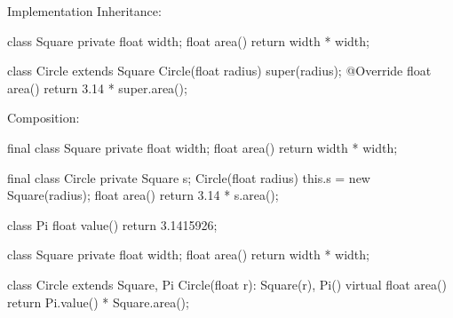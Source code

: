 \documentclass{article}
\begin{document}

\begin{pptWide}{2}
Implementation Inheritance:
\par
{\small\begin{ffcode}
class Square
  private float width;
  float area()
    return width * width;

class Circle extends Square
  Circle(float radius)
    super(radius);
  @Override float area()
    return 3.14 * super.area();
\end{ffcode}
}
\par\columnbreak\par
Composition:
\par
{\small\begin{ffcode}
final class Square
  private float width;
  float area()
    return width * width;

final class Circle
  private Square s;
  Circle(float radius)
    this.s = new Square(radius);
  float area()
    return 3.14 * s.area();
\end{ffcode}
}
\end{pptWide}
\plush{}


\begin{pptWide}{2}
\par
{\small\begin{ffcode}
class Pi
  float value()
    return 3.1415926;

class Square
  private float width;
  float area()
    return width * width;

class Circle extends Square, Pi
  Circle(float r): Square(r), Pi() {}
  virtual float area()
    return Pi.value() * Square.area();
\end{ffcode}
}
\par\columnbreak\par
{}
\end{pptWide}
\plush{}
\end{document}
